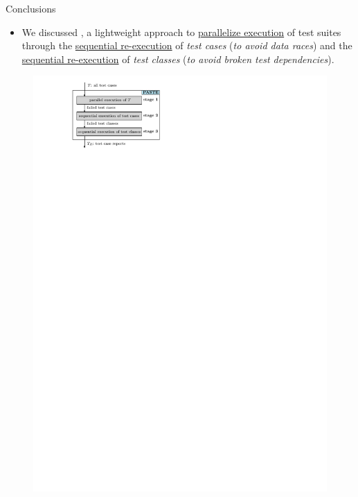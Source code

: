 \documentclass{beamer}
\begin{document}
\begin{frame}{Conclusions}
\begin{itemize}
	\item{\footnotesize We discussed {\rsm \tname{}}, a lightweight approach to {\rsm \underline{parallelize execution}} of test suites through the {\rsm \underline{sequential re-execution} of \textit{test cases}} (\textit{to avoid data races}) and the {\rsm \underline{sequential re-execution} of \textit{test classes}} (\textit{to avoid broken test dependencies}).}
\end{itemize}
\begin{center}
\begin{figure}[!htb]
\centering
\begin{minipage}{0.475\textwidth}
	\centering
	\includegraphics[width=\linewidth]{images/soundy.pdf}	
\end{minipage}%
\pause

\end{figure}
\end{center}
\end{frame}
\end{document}
